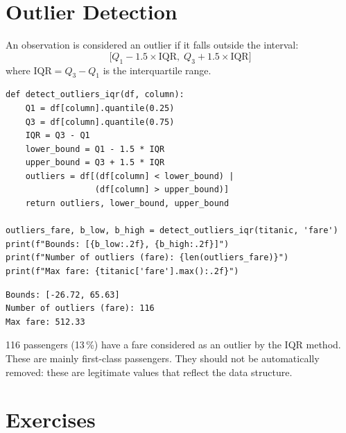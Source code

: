 \section{Outlier Detection}

\begin{definition}
An observation is considered an outlier if it falls outside the interval:
\[
\bigl[Q_1 - 1.5 \times \text{IQR},\; Q_3 + 1.5 \times \text{IQR}\bigr]
\]
where $\text{IQR} = Q_3 - Q_1$ is the interquartile range.
\end{definition}

\begin{codeblock}[title=\textbf{Python}]
\begin{verbatim}
def detect_outliers_iqr(df, column):
    Q1 = df[column].quantile(0.25)
    Q3 = df[column].quantile(0.75)
    IQR = Q3 - Q1
    lower_bound = Q1 - 1.5 * IQR
    upper_bound = Q3 + 1.5 * IQR
    outliers = df[(df[column] < lower_bound) |
                  (df[column] > upper_bound)]
    return outliers, lower_bound, upper_bound

outliers_fare, b_low, b_high = detect_outliers_iqr(titanic, 'fare')
print(f"Bounds: [{b_low:.2f}, {b_high:.2f}]")
print(f"Number of outliers (fare): {len(outliers_fare)}")
print(f"Max fare: {titanic['fare'].max():.2f}")
\end{verbatim}
\end{codeblock}

\begin{codeoutput}
\begin{verbatim}
Bounds: [-26.72, 65.63]
Number of outliers (fare): 116
Max fare: 512.33
\end{verbatim}
\end{codeoutput}

\begin{remark}
116 passengers (13\,\%) have a fare considered as an outlier by the IQR method. These are mainly first-class passengers. They should not be automatically removed: these are legitimate values that reflect the data structure.
\end{remark}

\section{Exercises}

